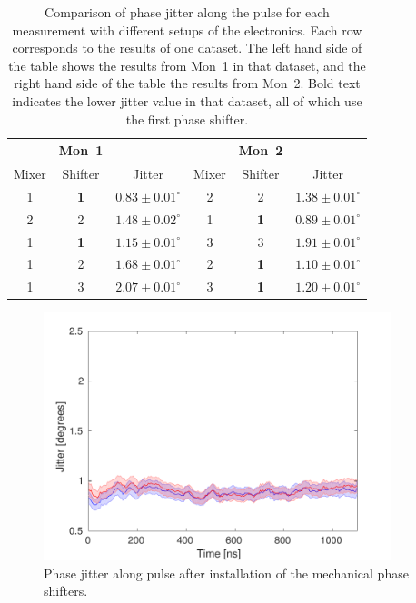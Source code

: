 \begin{table}
  \begin{center}
    \begin{tabular}{|c c c | c c c|}
	   \hline
	   & Mon~1 & & & Mon~2 & \\ \hline
      Mixer & Shifter & Jitter & Mixer & Shifter & Jitter \\ \hline
      1 & \textbf{1} & \(\mathbf{0.83\pm0.01^\circ}\) & 2 & 2 & \(1.38\pm0.01^\circ\)    \\
      2 & 2 & \(1.48\pm0.02^\circ\) & 1 & \textbf{1} & \(\mathbf{0.89\pm0.01^\circ}\)    \\ 
      1 & \textbf{1} & \(\mathbf{1.15\pm0.01^\circ}\) & 3 & 3 & \(1.91\pm0.01^\circ\)    \\ 
      1 & 2 & \(1.68\pm0.01^\circ\) & 2 & \textbf{1} & \(\mathbf{1.10\pm0.01^\circ}\)    \\ 
      1 & 3 & \(2.07\pm0.01^\circ\) & 3 & \textbf{1} & \(\mathbf{1.20\pm0.01^\circ}\)    \\  
	\hline
    \end{tabular}
    \caption{Comparison of phase jitter along the pulse for each measurement with different setups of the electronics. Each row corresponds to the results of one dataset. The left hand side of the table shows the results from Mon~1 in that dataset, and the right hand side of the table the results from Mon~2. Bold text indicates the lower jitter value in that dataset, all of which use the first phase shifter.}
  	\label{t:elecSwapResults}
  \end{center}
\end{table}

\begin{figure}
  \centering
  \includegraphics[width=0.9\textwidth]{Figures/phaseMons/jitterMechanicalShifters}
  \caption{Phase jitter along pulse after installation of the mechanical phase shifters.}
  \label{f:jitterMechanicalShifters}
\end{figure}


